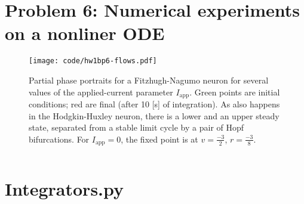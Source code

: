 \documentclass{tufte-handout}
\begin{document}
\inputminted[]{python}{code/hw1bWilsonC5p1.py}

\newpage
\section{Problem 6: Numerical experiments on a nonliner ODE}
\begin{figure}[ht]
 \texttt{[image: code/hw1bp6-flows.pdf]}
 \caption{Partial phase portraits for a Fitzhugh-Nagumo neuron for several 
values of the applied-current parameter $I_\mathrm{app}$. Green points are 
initial conditions; red are final (after 10 [s] of integration). As also 
happens in the Hodgkin-Huxley neuron, there is a lower and an upper steady 
state, separated from a stable limit cycle by a pair of Hopf bifurcations. For 
$I_\mathrm{app}=0$, the fixed point is at $v=\frac{-3}{2}$, $r=\frac{-3}{8}$.
\label{fig:fb}}
\end{figure}

\inputminted[]{python}{code/hw1bp6.py}

\newpage
\section{Integrators.py}
\inputminted[]{python}{code/Integrators.py}



\end{document}
